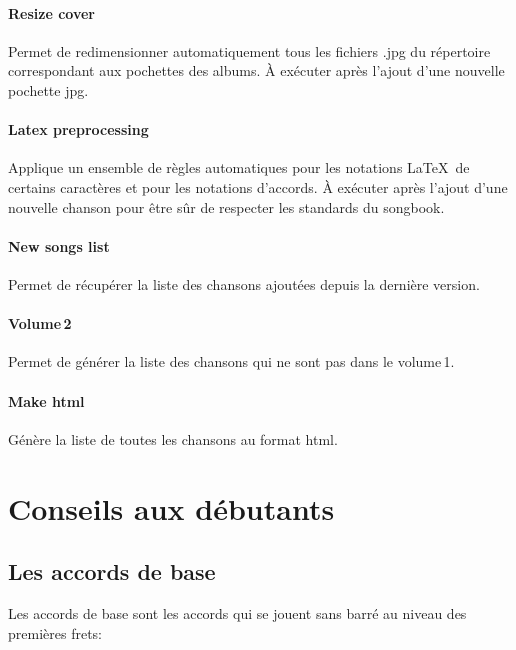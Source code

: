 \documentclass[versionenligne]{patacrep}
\begin{document}
\paragraph{Resize cover}
Permet de redimensionner automatiquement tous les fichiers .jpg du
répertoire  correspondant aux pochettes des
albums. À exécuter après l'ajout d'une nouvelle pochette jpg.

\paragraph{Latex preprocessing}
Applique un ensemble de règles automatiques pour les notations
\LaTeX\, de certains caractères et pour les notations d'accords.  À
exécuter après l'ajout d'une nouvelle chanson pour être sûr de
respecter les standards du songbook.

\paragraph{New songs list}
Permet de récupérer la liste des chansons ajoutées depuis la dernière
version.

\paragraph{Volume\,2}
Permet de générer la liste des chansons qui ne sont pas dans le
volume\,1.

\paragraph{Make html}
Génère la liste de toutes les chansons au format html.


\section{Conseils aux débutants}

\subsection{Les accords de base}

Les accords de base sont les accords qui se jouent sans barré au
niveau des premières frets:
\end{document}
